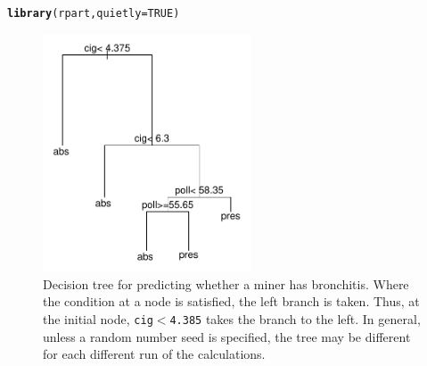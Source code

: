 \documentclass[12pt, a4paper,  BCOR=8.25mm, DIV=15]{scrartcl}\usepackage[]{graphicx}\usepackage[]{color}
\makeatletter
\newcommand{\hlnum}[1]{\textcolor[rgb]{0.686,0.059,0.569}{#1}}%
\newcommand{\hlstd}[1]{\textcolor[rgb]{0.345,0.345,0.345}{#1}}%
\newcommand{\hlkwc}[1]{\textcolor[rgb]{0.333,0.667,0.333}{#1}}%
\newcommand{\hlkwd}[1]{\textcolor[rgb]{0.737,0.353,0.396}{\textbf{#1}}}%
\newenvironment{kframe}{%
 \def\at@end@of@kframe{}%
 \ifinner\ifhmode%
  \def\at@end@of@kframe{\end{minipage}}%
  \begin{minipage}{\columnwidth}%
 \fi\fi%
 \def\FrameCommand##1{\hskip\@totalleftmargin \hskip-\fboxsep
 \colorbox{shadecolor}{##1}\hskip-\fboxsep
     \hskip-\linewidth \hskip-\@totalleftmargin \hskip\columnwidth}%
 \MakeFramed {\advance\hsize-\width
   \@totalleftmargin\z@ \linewidth\hsize
   \@setminipage}}%
 {\par\unskip\endMakeFramed%
 \at@end@of@kframe}
\newenvironment{knitrout}{}{} %
\newcommand{\txtt}[1]{{\texttt{#1}}}
\makeatother
\begin{document}
\begin{knitrout}
\color{fgcolor}\begin{kframe}
\begin{alltt}
\hlkwd{library}\hlstd{(rpart,} \hlkwc{quietly}\hlstd{=}\hlnum{TRUE}\hlstd{)}
\end{alltt}
\end{kframe}
\end{knitrout}

\begin{figure}
\begin{knitrout}
\color{fgcolor}

{\centering \includegraphics[width=0.55\textwidth]{figs/xmeth-treefig-12_13-1} 

}



\end{knitrout}
\caption{Decision tree for predicting whether a miner has
    bronchitis.  Where the condition at a node is satisfied, the left
    branch is taken. Thus, at the initial node, \txtt{cig$<$4.385}
    takes the branch to the left.  In general, unless a random number
    seed is specified, the tree may be different for each different run of the
    calculations.
}\label{fig:tree}
\end{figure}
\end{document}
